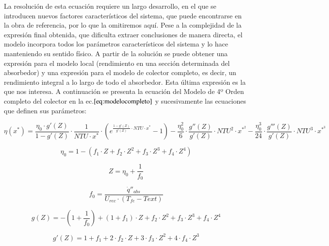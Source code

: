 La resolución de esta ecuación requiere un largo desarrollo, en el que se introducen nuevos factores característicos del sistema, que puede encontrarse en la obra de referencia, por lo que la omitiremos aquí. Pese a la complejidad de la expresión final obtenida, que dificulta extraer conclusiones de manera directa, el modelo incorpora todos los parámetros característicos del sistema y lo hace manteniendo su sentido físico. A partir de la solución se puede obtener una expresión para el modelo local (rendimiento en una sección determinada del absorbedor) y una expresión para el modelo de colector completo, es decir, un rendimiento integral a lo largo de todo el absorbedor. Esta última expresión es la que nos interesa. A continuación se presenta la ecuación del Modelo de 4º Orden completo del colector en la ec.\(\eqref{eq:modelocompleto}\) y sucesivamente las ecuaciones que definen sus parámetros:

\begin{equation}
    \eta(x^{*}) = \frac{\eta_{0} \cdot g'(Z)}{1-g'(Z)} \cdot \frac{1}{NTU \cdot x^{*}} \cdot \left(e^{\frac{1-g'(Z)}{g'(Z)}\cdot NTU \cdot x^{*}} - 1\right) - \frac{\eta_{0}^2}{6} \cdot \frac{g''(Z)}{g'(Z)} \cdot NTU^{2} \cdot x^{*^{2}} - \frac{\eta_{0}^{3}}{24} \cdot \frac{g'''(Z)}{g'(Z)} \cdot NTU^{3} \cdot x^{*^{3}}
    \label{eq:modelocompleto}
\end{equation}

\begin{equation}
    \eta_{0} = 1 - (f_{1} \cdot Z + f_{2} \cdot Z^{2} + f_{3} \cdot Z^{3} + f_{4} \cdot Z^{4})
    \label{eq:rendimiento0}
\end{equation}

\begin{equation}
    Z = \eta_{0} + \frac{1}{f_{0}} 
    \label{eq:zeta}
\end{equation}

\begin{equation}
    f_0 = \frac{\dot{q}''_{abs}}{U_{rec} \cdot (T_{fe}-T{ext})}
    \label{eq:f0}
\end{equation}

\begin{equation}
    g(Z) = -\left(1+\frac{1}{f_{0}}\right)+(1+f_{1})\cdot Z + f_{2}\cdot Z^{2} +  f_{3}\cdot Z^{3} + f_{4}\cdot Z^{4} 
    \label{eq:gdezeta}
\end{equation}

\begin{equation}
    g'(Z) = 1 + f_{1} + 2 \cdot f_{2} \cdot Z + 3 \cdot f_{3} \cdot Z^{2} + 4 \cdot f_{4} \cdot Z^{3} 
    \label{eq:gprimadezeta}
\end{equation}

